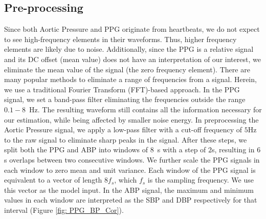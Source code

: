 \documentclass[letterpaper, 10 pt, conference]{ieeeconf}
\begin{document}
\subsection{Pre-processing}
Since both Aortic Pressure and PPG originate from heartbeats, we do not expect to see high-frequency elements in their waveforms. Thus, higher frequency elements are likely due to noise. Additionally, since the PPG is a relative signal and its DC offset (mean value) does not have an interpretation of our interest, we eliminate the mean value of the signal (the zero frequency element). There are many popular methods to eliminate a range of frequencies from a signal. Herein, we use a traditional Fourier Transform (FFT)-based approach. 
In the PPG signal, we set a band-pass filter eliminating the frequencies outside the range $0.1-8$~Hz. The resulting waveform still contains all the information necessary for our estimation, while being affected by smaller noise energy. In preprocessing the Aortic Pressure signal, we apply a low-pass filter with a cut-off frequency of $5$Hz to the raw signal to eliminate sharp peaks in the signal. After these steps, we split both the PPG and ABP into windows of $8$~s with a step of $2$s, resulting in $6$s overlaps between two consecutive windows.
We further scale the PPG signals in each window to zero mean and unit variance.
Each window of the PPG signal is equivalent to a vector of length $8f_s$, which $f_s$ is the sampling frequency. We use this vector as the model input.
In the ABP signal, the maximum and minimum values in each window are interpreted as the SBP and DBP respectively for that interval (Figure \ref{fig: PPG_BP_Cor}).
\end{document}
